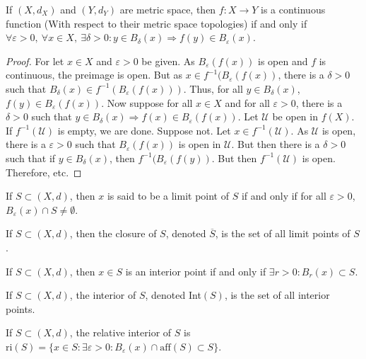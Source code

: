 \documentclass[crop=false,class=book,oneside]{standalone}
\begin{document}
            \begin{theorem}
            If $(X,d_X)$ and $(Y,d_Y)$ are metric space, then $f:X\rightarrow Y$ is a continuous function (With respect to their metric space topologies) if and only if $\forall \varepsilon>0,\ \forall x\in X,\ \exists \delta>0:y\in B_{\delta}(x)\Rightarrow f(y) \in B_{\varepsilon}(x)$.
            \end{theorem}
            \begin{proof}
            For let $x\in X$ and $\varepsilon>0$ be given. As $B_{\varepsilon}(f(x))$ is open and $f$ is continuous, the preimage is open. But as $x\in f^{-1}(B_{\varepsilon}(f(x))$, there is a $\delta>0$ such that $B_{\delta}(x)\in f^{-1}(B_{\varepsilon}(f(x)))$. Thus, for all $y \in B_{\delta}(x)$, $f(y) \in B_{\varepsilon}(f(x))$. Now suppose for all $x\in X$ and for all $\varepsilon>0$, there is a $\delta>0$ such that $y\in B_{\delta}(x)\Rightarrow f(x) \in B_{\varepsilon}(f(x))$. Let $\mathcal{U}$ be open in $f(X)$. If $f^{-1}(\mathcal{U})$ is empty, we are done. Suppose not. Let $x\in f^{-1}(\mathcal{U})$. As $\mathcal{U}$ is open, there is a $\varepsilon>0$ such that $B_{\varepsilon}(f(x))$ is open in $\mathcal{U}$. But then there is a $\delta>0$ such that if $y\in B_{\delta}(x)$, then $f^{-1}(B_{\varepsilon}(f(y))$. But then $f^{-1}(\mathcal{U})$ is open. Therefore, etc.
            \end{proof}
            \begin{definition}
            If $S\subset (X,d)$, then $x$ is said to be a limit point of $S$ if and only if for all $\varepsilon>0$, $B_{\varepsilon}(x)\cap S \ne \emptyset$.
            \end{definition}
            \begin{definition}
            If $S\subset (X,d)$, then the closure of $S$, denoted $\overline{S}$, is the set of all limit points of $S$.
            \end{definition}
            \begin{definition}
            If $S\subset (X,d)$, then $x\in S$ is an interior point if and only if $\exists r>0:B_{r}(x)\subset S$.
            \end{definition}
            \begin{definition}
            If $S\subset (X,d)$, the interior of $S$, denoted Int$(S)$, is the set of all interior points.
            \end{definition}
            \begin{definition}
            If $S\subset (X,d)$, the relative interior of $S$ is $\textrm{ri}(S)= \{x\in S:\exists \varepsilon>0:B_{\varepsilon}(x)\cap \textrm{aff}(S)\subset S\}$.
            \end{definition}
\end{document}
